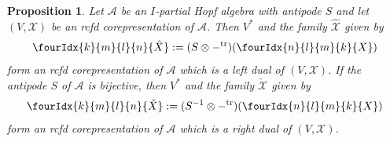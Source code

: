 \documentclass[11pt]{article}
\DeclareMathOperator{\tr}{\mathrm{tr}}
\newcommand{\dual}[1]{#1^{*}}
\newcommand{\dualop}[1]{#1^{\tr}}
\newcommand{\dualco}[1]{\hat{#1}}
\newcommand{\dualcor}[1]{\check{#1}}
\newcommand{\Gr}[5]{\fourIdx{#2}{#4}{#3}{#5}{#1}}%
\newtheorem{Prop}[Theorem]{Proposition}
\theoremstyle{definition}
\numberwithin{equation}{section}
\begin{document}
\begin{Prop}
  Let $\mathscr{A}$ be an $I$-partial Hopf algebra with antipode $S$
  and  let $(V,\mathscr{X})$ be an rcfd
  corepresentation of $\mathscr{A}$. Then $\dual{V}$ and the family
  $\dualco{\mathscr{X}}$ given by
   \begin{align} \label{eq:rep-left-dual}
\Gr{\dualco{X}}{k}{l}{m}{n}   :=  (S \otimes \dualop{-})(\Gr{X}{n}{m}{l}{k}) 
   \end{align} 
   form an rcfd corepresentation of $\mathscr{A}$  which is a left dual of $(V,\mathscr{X})$. If the antipode
   $S$ of $\mathscr{A}$ is bijective, then $\dual{V}$ and the family
   $\dualcor{\mathscr{X}}$ given by 
   \begin{align} \label{eq:rep-right-dual}
 \Gr{\dualcor{X}}{k}{l}{m}{n} :=(S^{-1}
   \otimes \dualop{-})(\Gr{X}{n}{m}{l}{k})    
   \end{align}
 form an rcfd corepresentation
 of $\mathscr{A}$ which is a
   right dual of $(V,\mathscr{X})$.
  \end{Prop}
\end{document}
